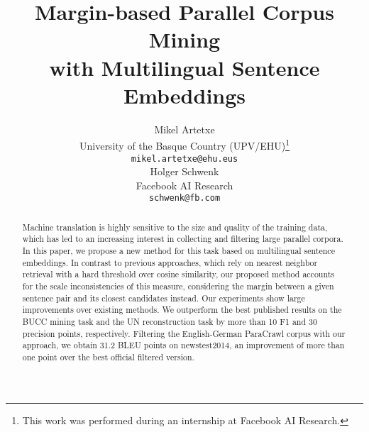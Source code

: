 \documentclass[11pt,a4paper]{article}
\title{Margin-based Parallel Corpus Mining \\ with Multilingual Sentence Embeddings}
\author{Mikel Artetxe \\
  University of the Basque Country (UPV/EHU)\thanks{This work was performed during an internship at Facebook AI Research.} \\
  {\tt mikel.artetxe@ehu.eus} \\\And
  Holger Schwenk \\
  Facebook AI Research \\
  {\tt schwenk@fb.com} \\}
\date{}
\begin{document}
\maketitle
\begin{abstract}
Machine translation is highly sensitive to the size and quality of the training data, which has led to an increasing interest in collecting and filtering large parallel corpora. In this paper, we propose a new method for this task based on multilingual sentence embeddings.
In contrast to previous approaches, which rely on nearest neighbor retrieval with a hard threshold over cosine similarity, our proposed method accounts for the scale inconsistencies of this measure, considering the margin between a given sentence pair and its closest candidates instead. Our experiments show large improvements over existing methods. We outperform the best published results on the BUCC mining task and the UN reconstruction task by more than 10 F1 and 30 precision points, respectively. Filtering the English-German ParaCrawl corpus with our approach, we obtain 31.2 BLEU points on newstest2014, an improvement of more than one point over the best official filtered version.
\end{abstract}
\end{document}
